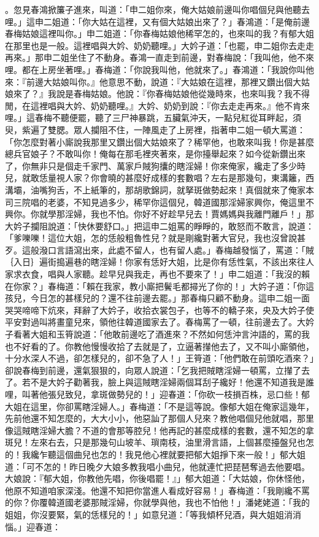 \begin{showcontents}{}
。忽見春鴻掀簾子進來，叫道：「申二姐你來，俺大姑娘前邊叫你唱個兒與他聽去哩。」這申二姐道：「你大姑在這裡，又有個大姑娘出來了？」春鴻道：「是俺前邊春梅姑娘這裡叫你。」申二姐道：「你春梅姑娘他稀罕怎的，也來叫的我？有郁大姐在那里也是一般。這裡唱與大妗、奶奶聽哩。」大妗子道：「也罷，申二姐你去走走再來。」那申二姐坐住了不動身。春鴻一直走到前邊，對春梅說：「我叫他，他不來哩。都在上房坐著哩。」春梅道：「你說我叫他，他就來了。」春鴻道：「我說你叫他來：『前邊大姑娘叫你。』他意思不動，說道：『大姑娘在這裡，那裡又鑽出個大姑娘來了？』我說是春梅姑娘。他說：『你春梅姑娘他從幾時來，也來叫我？我不得閒，在這裡唱與大妗、奶奶聽哩。』大妗、奶奶到說：『你去走走再來。』他不肯來哩。」這春梅不聽便罷，聽了三尸神暴跳，五臟氣沖天，一點兒紅從耳畔起，須臾，紫遍了雙腮。眾人攔阻不住，一陣風走了上房裡，指著申二姐一頓大罵道：「你怎麼對著小廝說我那里又鑽出個大姑娘來了？稀罕他，也敢來叫我！你是甚麼總兵官娘子？不敢叫你！俺每在那毛裡夾著來，是你擡舉起來？如今從新鑽出來了，你無非只是個走千家門、萬家戶賊狗攮的瞎淫婦！你來俺家，纔走了多少時兒，就敢恁量視人家？你會曉的甚麼好成樣的套數唱？左右是那幾句，東溝籬，西溝壩，油嘴狗舌，不上紙筆的，那胡歌錦詞，就拏斑做勢起來！真個就來了俺家本司三院唱的老婆，不知見過多少，稀罕你這個兒，韓道國那淫婦家興你，俺這里不興你。你就學那淫婦，我也不怕。你好不好趁早兒去！賈媽媽與我離門離戶！」那大妗子攔阻說道：「快休要舒口。」把這申二姐罵的睜睜的，敢怒而不敢言，說道：「爹嚛嚛！這位大姐，怎的恁般粗魯性兒？就是剛纔對著大官兒，我也沒曾說甚歹。這般潑口言語瀉出來，此處不留人，也有留人處。」春梅越發惱了，罵道：「賊｛入日｝遍街搗遍巷的瞎淫婦！你家有恁好大姐，比是你有恁性氣，不該出來往人家求衣食，唱與人家聽。趁早兒與我走，再也不要來了！」申二姐道：「我沒的賴在你家？」春梅道：「賴在我家，教小廝把鬢毛都撏光了你的！」大妗子道：「你這孩兒，今日怎的甚樣兒的？還不往前邊去罷。」那春梅只顧不動身。這申二姐一面哭哭啼啼下炕來，拜辭了大妗子，收拾衣裳包子，也等不的轎子來，央及大妗子使平安對過叫將畫童兒來，領他往韓道國家去了。春梅罵了一頓，往前邊去了。大妗子看著大姐和玉筲說道：「他敢前邊吃了酒進來？不然如何恁沖言沖語的，罵的我也不好看的了。你教他慢慢收拾了去就是了，立逼著攆他去了，又不叫小廝領他，十分水深人不過，卻怎樣兒的，卻不急了人！」王筲道：「他們敢在前頭吃酒來？」卻說春梅到前邊，還氣狠狠的，向眾人說道：「乞我把賊瞎淫婦一頓罵，立攆了去了。若不是大妗子勸著我，臉上與這賊瞎淫婦兩個耳刮子纔好！他還不知道我是誰哩，叫著他張兒致兒，拿斑做勢兒的！」迎春道：「你砍一枝損百株，忌口些！郁大姐在這里，你卻罵瞎淫婦人。」春梅道：「不是這等說。像郁大姐在俺家這幾年，先前他還不知怎麼的，大大小小，他惡訕了那個人兒來？教他唱個兒他就唱，那里像這賊瞎淫婦大膽？不道的會那等腔兒！他再記的甚麼成樣的套數，還不知怎的拿斑兒！左來右去，只是那幾句山坡羊、瑣南枝，油里滑言語，上個甚麼擡盤兒也怎的！我纔乍聽這個曲兒也怎的！我見他心裡就要把郁大姐掙下來一般！」郁大姐道：「可不怎的！昨日晚夕大娘多教我唱小曲兒，他就連忙把琵琶奪過去他要唱。大娘說：『郁大姐，你教他先唱，你後唱罷！』」郁大姐道：「大姑娘，你休怪他，他原不知道咱家深淺。他還不知把你當進人看成好容易！」春梅道：「我剛纔不罵的你？你覆韓道國老婆那賊淫婦，你就學與他，我也不怕他！」潘姥姥道：「我的姐姐，你沒要緊，氣的恁樣兒的！」如意兒道：「等我傾杯兒酒，與大姐姐消消惱。」迎春道：
\end{showcontents}
